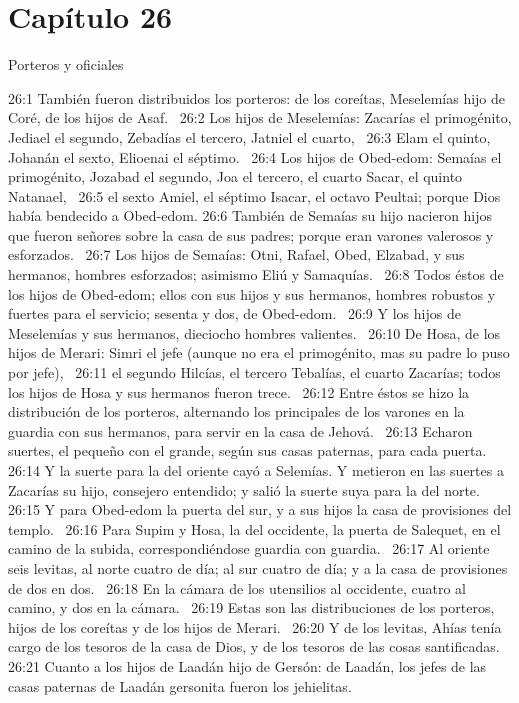 \section*{Capítulo 26}
Porteros y oficiales  

26:1 También fueron distribuidos los porteros: de los coreítas, Meselemías hijo de Coré, de los hijos de Asaf.  
26:2 Los hijos de Meselemías: Zacarías el primogénito, Jediael el segundo, Zebadías el tercero, Jatniel el cuarto,  
26:3 Elam el quinto, Johanán el sexto, Elioenai el séptimo.  
26:4 Los hijos de Obed-edom: Semaías el primogénito, Jozabad el segundo, Joa el tercero, el cuarto Sacar, el quinto Natanael,  
26:5 el sexto Amiel, el séptimo Isacar, el octavo Peultai; porque Dios había bendecido a Obed-edom. 
26:6 También de Semaías su hijo nacieron hijos que fueron señores sobre la casa de sus padres; porque eran varones valerosos y esforzados.  
26:7 Los hijos de Semaías: Otni, Rafael, Obed, Elzabad, y sus hermanos, hombres esforzados; asimismo Eliú y Samaquías.  
26:8 Todos éstos de los hijos de Obed-edom; ellos con sus hijos y sus hermanos, hombres robustos y fuertes para el servicio; sesenta y dos, de Obed-edom.  
26:9 Y los hijos de Meselemías y sus hermanos, dieciocho hombres valientes.  
26:10 De Hosa, de los hijos de Merari: Simri el jefe (aunque no era el primogénito, mas su padre lo puso por jefe),  
26:11 el segundo Hilcías, el tercero Tebalías, el cuarto Zacarías; todos los hijos de Hosa y sus hermanos fueron trece.  
26:12 Entre éstos se hizo la distribución de los porteros, alternando los principales de los varones en la guardia con sus hermanos, para servir en la casa de Jehová.  
26:13 Echaron suertes, el pequeño con el grande, según sus casas paternas, para cada puerta.  
26:14 Y la suerte para la del oriente cayó a Selemías. Y metieron en las suertes a Zacarías su hijo, consejero entendido; y salió la suerte suya para la del norte.  
26:15 Y para Obed-edom la puerta del sur, y a sus hijos la casa de provisiones del templo.  
26:16 Para Supim y Hosa, la del occidente, la puerta de Salequet, en el camino de la subida, correspondiéndose guardia con guardia.  
26:17 Al oriente seis levitas, al norte cuatro de día; al sur cuatro de día; y a la casa de provisiones de dos en dos.  
26:18 En la cámara de los utensilios al occidente, cuatro al camino, y dos en la cámara.  
26:19 Estas son las distribuciones de los porteros, hijos de los coreítas y de los hijos de Merari.  
26:20 Y de los levitas, Ahías tenía cargo de los tesoros de la casa de Dios, y de los tesoros de las cosas santificadas.  
26:21 Cuanto a los hijos de Laadán hijo de Gersón: de Laadán, los jefes de las casas paternas de Laadán gersonita fueron los jehielitas.  
